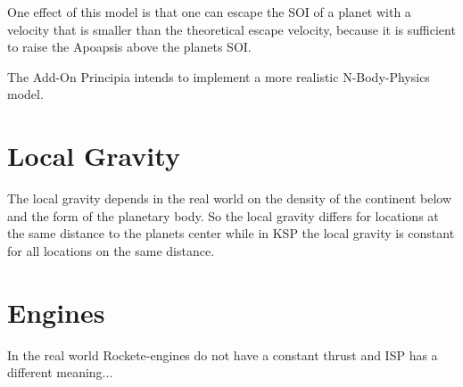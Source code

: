 \documentclass[11pt]{report}
\begin{document}
One effect of this model is that one can escape the SOI of a planet
with a velocity that is smaller than the theoretical escape velocity,
 because it is sufficient to raise the Apoapsis
above the planets SOI.

The Add-On Principia \cite{principia} intends to implement a more
realistic N-Body-Physics  model.

\section{Local Gravity}

The local gravity depends in the real world on the density of the
continent below and the form of the planetary body. So the local
gravity differs for locations at the same distance to the planets
center while in KSP the local gravity is constant for all locations on
the same distance.

\section{Engines}

In the real world Rockete-engines do not have a constant thrust and
ISP has a different meaning...

\printindex
\end{document}

